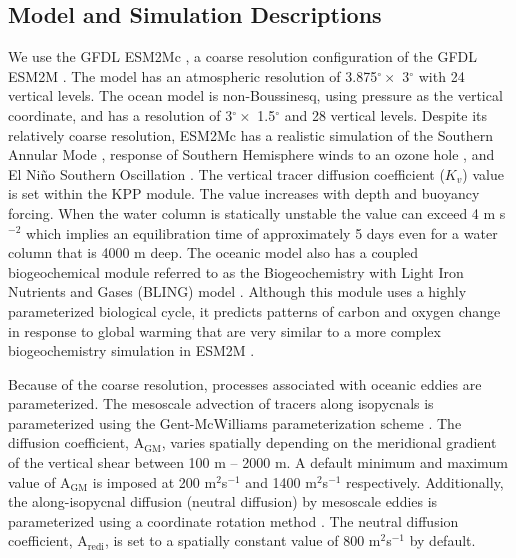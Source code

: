 \subsection{Model and Simulation Descriptions}
We use the GFDL ESM2Mc \citep{Galbraith2011}, a coarse resolution configuration
of the GFDL ESM2M \citep{Dunne2012}. The model has an atmospheric resolution of
3.875$^{\circ} \times$ 3$^{\circ}$ with 24 vertical levels. The ocean model is
non-Boussinesq, using pressure as the vertical coordinate, and has a resolution
of 3$^{\circ} \times$ 1.5$^{\circ}$ and 28 vertical levels. Despite its
relatively coarse resolution, ESM2Mc has a realistic simulation of the Southern
Annular Mode \citep{Galbraith2011}, response of Southern Hemisphere winds to an
ozone hole \citep{Seviour2017}, and El Ni\~{n}o Southern Oscillation
\citep{Russell2014}. The vertical tracer diffusion coefficient ($K_v$) value is
set within the KPP module. The value increases with depth and buoyancy forcing.
When the water column is statically unstable the value can exceed 4 m s$^{-2}$
which implies an equilibration time of approximately 5 days even for a water
column that is 4000 m deep. The oceanic model also has a coupled
biogeochemical module referred to as the Biogeochemistry with Light Iron
Nutrients and Gases (BLING) model \citep{Galbraith2010}. Although this module
uses a highly parameterized biological cycle, it predicts patterns of carbon and
oxygen change in response to global warming that are very similar to a more complex
biogeochemistry simulation in ESM2M \citep{Small2014}.

Because of the coarse resolution, processes associated with oceanic eddies are
parameterized. The mesoscale advection of tracers along isopycnals is
parameterized using the Gent-McWilliams parameterization scheme \citep{Gent2010}.
The diffusion coefficient, A$_{\mathrm{GM}}$, varies spatially depending on the
meridional gradient of the vertical shear between 100 m -- 2000 m. A default
minimum and maximum value of A$_{\mathrm{GM}}$ is imposed at 200 m$^2$s$^{-1}$
and 1400 m$^2$s$^{-1}$ respectively. Additionally, the along-isopycnal diffusion
(neutral diffusion) by mesoscale eddies is parameterized using a coordinate
rotation method \citep{Redi1982a}. The neutral diffusion coefficient,
A$_{\mathrm{redi}}$, is set to a spatially constant value of 800 m$^2$s$^{-1}$
by default.

